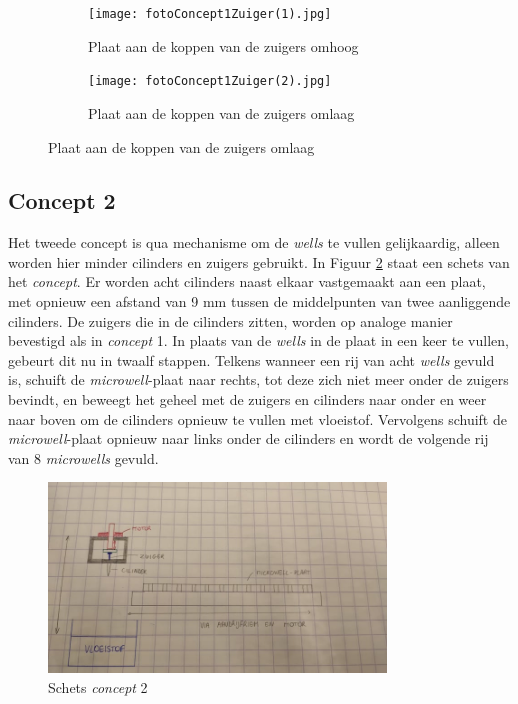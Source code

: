 \documentclass[a4paper,twoside,kulak]{kulakreport} %
\begin{document}
\begin{figure}
	\centering
	\begin{subfigure}{.5\textwidth}
		\centering
		\texttt{[image: fotoConcept1Zuiger(1).jpg]}
		\caption{Plaat aan de koppen van de zuigers omhoog}
	\end{subfigure}%
	\begin{subfigure}{.5\textwidth}
		\centering
		\texttt{[image: fotoConcept1Zuiger(2).jpg]}
		\caption{Plaat aan de koppen van de zuigers omlaag}
	\end{subfigure}
	\label{fig: foto concept 1 zuiger}
\end{figure}

\subsection{Concept 2}
Het tweede concept is qua mechanisme om de \textit{wells} te vullen gelijkaardig, alleen worden hier minder cilinders en zuigers gebruikt. In Figuur \ref{fig: schets concept 2} staat een schets van het \textit{concept}. Er worden acht cilinders naast elkaar vastgemaakt aan een plaat, met opnieuw een afstand van 9 mm tussen de middelpunten van twee aanliggende cilinders. De zuigers die in de cilinders zitten, worden op analoge manier bevestigd als in \textit{concept} 1. In plaats van de \textit{wells} in de plaat in een keer te vullen, gebeurt dit nu in twaalf stappen. Telkens wanneer een rij van acht \textit{wells} gevuld is, schuift de \textit{microwell}-plaat naar rechts, tot deze zich niet meer onder de zuigers bevindt, en beweegt het geheel met de zuigers en cilinders naar onder en weer naar boven om de cilinders opnieuw te vullen met vloeistof. Vervolgens schuift de \textit{microwell}-plaat opnieuw naar links onder de cilinders en wordt de volgende rij van 8 \textit{microwells} gevuld.

\begin{figure}[h]
	\centering
	\includegraphics[width=0.8\textwidth]{fotoConcept2.jpg}
	\caption{Schets \textit{concept} 2}
	\label{fig: schets concept 2}
	
\end{figure} 
\end{document}
